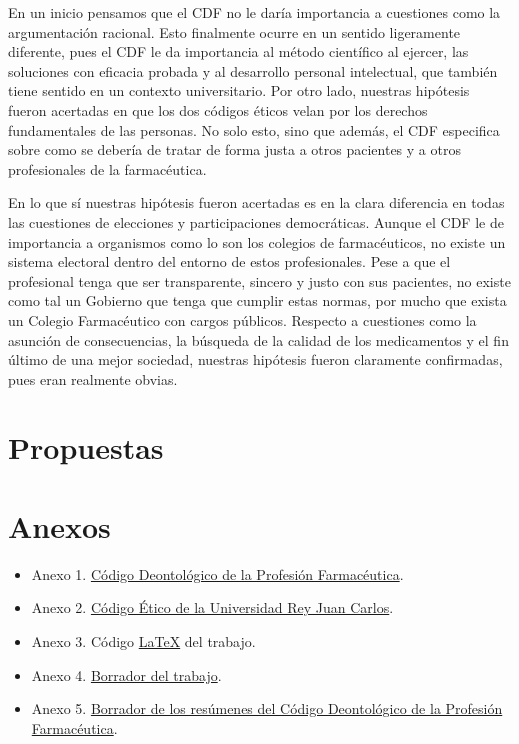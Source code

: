 \documentclass[11pt,a4paper]{article}
\begin{document}
En un inicio pensamos que el CDF no le daría importancia a cuestiones como la argumentación racional. Esto finalmente ocurre en un sentido ligeramente diferente, pues el CDF le da importancia al método científico al ejercer, las soluciones con eficacia probada y al desarrollo personal intelectual, que también tiene sentido en un contexto universitario. Por otro lado, nuestras hipótesis fueron acertadas en que los dos códigos éticos velan por los derechos fundamentales de las personas. No solo esto, sino que además, el CDF especifica sobre como se debería de tratar de forma justa a otros pacientes y a otros profesionales de la farmacéutica.

En lo que sí nuestras hipótesis fueron acertadas es en la clara diferencia en todas las cuestiones de elecciones y participaciones democráticas. Aunque el CDF le de importancia a organismos como lo son los colegios de farmacéuticos, no existe un sistema electoral dentro del entorno de estos profesionales. Pese a que el profesional tenga que ser transparente, sincero y justo con sus pacientes, no existe como tal un Gobierno que tenga que cumplir estas normas, por mucho que exista un Colegio Farmacéutico con cargos públicos. Respecto a cuestiones como la asunción de consecuencias, la búsqueda de la calidad de los medicamentos y el fin último de una mejor sociedad, nuestras hipótesis fueron claramente confirmadas, pues eran realmente obvias.

\section{Propuestas}


\pagebreak
\setcounter{secnumdepth}{0}
\section{Anexos}
\begin{itemize}[label = {}]
	\item Anexo 1. \href{https://www.portalfarma.com/Profesionales/organizacionfcolegial/portal-transparencia/Documents/2018-Codigo-Deontologia-Profesion-Farmaceutica-CGCOF.pdf}{Código Deontológico de la Profesión Farmacéutica}.
	\item Anexo 2. \href{https://www.urjc.es/codigoetico}{Código Ético de la Universidad Rey Juan Carlos}.
\item Anexo 3. Código \href{https://github.com/Denis-urjc/PJtrabajo}{\LaTeX} del trabajo.
\item Anexo 4. \href{https://docs.google.com/document/d/1JPIhGiP2SUPTwZ42QgbEhY5bHKPIPoN0i3u79ej2DwQ/edit#heading=h.zf8tz9rpog2d}{Borrador del trabajo}.
\item Anexo 5. \href{https://docs.google.com/document/d/1jByW4G1lbvmoq82MXhN4lJDx3bpDZP1n1jSouQVpACU/edit#heading=h.ocedmy22huli}{Borrador de los resúmenes del Código Deontológico de la Profesión Farmacéutica}.
\end{itemize}
\end{document}
